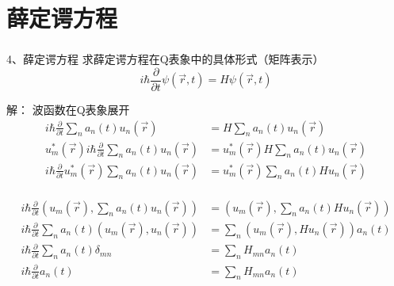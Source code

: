 \section{薛定谔方程}
\begin{frame} 
    \frametitle{}
    \begin{tcolorbox1}{4、薛定谔方程}
        求薛定谔方程在Q表象中的具体形式（矩阵表示）
        $$ i\hbar \frac{\partial}{\partial t }\psi (\vec{r},t) =H\psi (\vec{r},t)$$
    \end{tcolorbox1}
    \alert{解：} 波函数在Q表象展开
    \begin{equation*}
        \begin{split}
            i\hbar \frac{\partial}{\partial t }\sum_n a_n(t) u_n(\vec{r})  &=H\sum_n a_n(t) u_n(\vec{r}) \\
            u_m ^* (\vec{r}) i\hbar \frac{\partial}{\partial t }\sum_n a_n(t) u_n(\vec{r})  &=u_m ^* (\vec{r})H\sum_n a_n(t) u_n(\vec{r}) \\
            i\hbar \frac{\partial}{\partial t }u_m ^* (\vec{r}) \sum_n a_n(t) u_n(\vec{r})  &=u_m ^* (\vec{r})\sum_n a_n(t) Hu_n(\vec{r}) \\      
        \end{split} 
    \end{equation*}
\end{frame}

\begin{frame} 
    \begin{equation*}
        \begin{split}
            i\hbar \frac{\partial}{\partial t }(u_m (\vec{r}), \sum_n a_n(t) u_n(\vec{r}) ) &=(u_m (\vec{r}), \sum_n a_n(t) Hu_n(\vec{r})) \\
            i\hbar \frac{\partial}{\partial t }\sum_n a_n(t)(u_m (\vec{r}),  u_n(\vec{r}) ) &=\sum_n (u_m (\vec{r}),  Hu_n(\vec{r}))a_n(t) \\
            i\hbar \frac{\partial}{\partial t }\sum_n a_n(t)\delta_{mn} &=\sum_n  H_{mn} a_n(t) \\
            i\hbar \frac{\partial}{\partial t } a_n(t) &=\sum_n H_{mn} a_n(t)  \\
        \end{split} 
    \end{equation*}
\end{frame}

